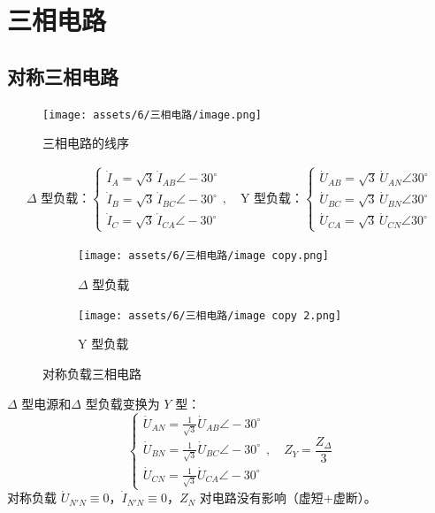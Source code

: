 \documentclass[UTF8]{report}
\theoremstyle{MyLineTheoremStyle} %
\theoremstyle{MyBlockTheoremStyle} %
\theoremstyle{MySubsubsectionStyle} %
\begin{document}
\section{三相电路}

\subsection{对称三相电路}

\begin{figure}[H]\centering
    \texttt{[image: assets/6/三相电路/image.png]}
    \caption{三相电路的线序}
\end{figure}


\begin{gather}
    \text{$\Delta$ 型负载：}
    \begin{cases}
        \dot{I}_A = \sqrt{3} \, \dot{I}_{AB} \angle -30^\circ \\
        \dot{I}_B = \sqrt{3} \, \dot{I}_{BC} \angle -30^\circ \\
        \dot{I}_C = \sqrt{3} \, \dot{I}_{CA} \angle -30^\circ
    \end{cases}
    ,\quad 
    \text{Y 型负载：}
    \begin{cases}
        \dot{U}_{AB} = \sqrt{3} \, \dot{U}_{AN} \angle 30^\circ \\
        \dot{U}_{BC} = \sqrt{3} \, \dot{U}_{BN} \angle 30^\circ \\
        \dot{U}_{CA} = \sqrt{3} \, \dot{U}_{CN} \angle 30^\circ
    \end{cases}
    \end{gather}
    
\begin{figure}[H]\centering
\begin{subfigure}[b]{0.5\columnwidth}\centering
    \texttt{[image: assets/6/三相电路/image copy.png]}
    \caption{$\Delta$ 型负载}
\end{subfigure}\hfill
\begin{subfigure}[b]{0.5\columnwidth}\centering
    \texttt{[image: assets/6/三相电路/image copy 2.png]}
    \caption{Y 型负载}
\end{subfigure}
\caption{对称负载三相电路}
\end{figure}

$\Delta$ 型电源和$\Delta$ 型负载变换为 $Y$ 型：
\begin{equation}
\begin{cases}
\dot{U}_{AN} = \frac{1}{\sqrt{3}} \dot{U}_{AB} \angle -30^\circ \\
\dot{U}_{BN} = \frac{1}{\sqrt{3}} \dot{U}_{BC} \angle -30^\circ \\
\dot{U}_{CN} = \frac{1}{\sqrt{3}} \dot{U}_{CA} \angle -30^\circ
\end{cases},\quad 
Z_{Y} = \frac{Z_{\Delta}}{3}
\end{equation}
对称负载 $\dot{U}_{N'N} \equiv 0$，$\dot{I}_{N'N} \equiv 0$，$Z_N$ 对电路没有影响（虚短+虚断）。
\end{document}
